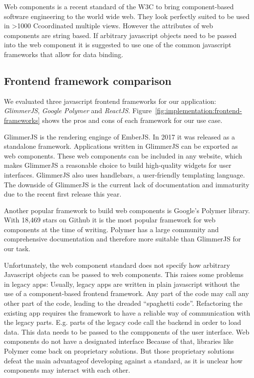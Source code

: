 \documentclass{article}
\newcommand\hmm[1]{\ifnum\ifhmode\spacefactor\else2000\fi>1000 \uppercase{#1}\else#1\fi}
\newcommand{\cmvs}{\hmm{c}oordinated multiple views}
\begin{document}
Web components is a recent standard of the W3C\cite{W3C2017} to bring component-based software engineering to the world wide web.
They look perfectly suited to be used in \cmvs{}.
However the attributes of web components are string based.
If arbitrary javascript objects need to be passed into the web component it is suggested to use one of the common javascript frameworks that allow for data binding.

\subsection{Frontend framework comparison}

We evaluated three javascript frontend frameworks for our application: \emph{GlimmerJS}, \emph{Google Polymer} and \emph{ReactJS}.
Figure~\ref{fig:implementation:frontend-frameworks} shows the pros and cons of each framework for our use case.

GlimmerJS is the rendering enginge of EmberJS\cite{Ember2017}.
In 2017 it was released as a standalone framework.
Applications written in GlimmerJS can be exported as web components.
These web components can be included in any website, which makes GlimmerJS a reasonable choice to build high-quality widgets for user interfaces.
GlimmerJS also uses handlebars\cite{Handlebars2017}, a user-friendly templating language.
The downside of GlimmerJS is the current lack of documentation and immaturity due to the recent first release this year.

Another popular framework to build web components is Google's Polymer library\cite{Polymer2017}.
With 18,469 stars on Github it is the most popular framework for web components at the time of writing.
Polymer has a large community and comprehensive documentation and therefore more suitable than GlimmerJS for our task.

Unfortunately, the web component standard does not specify how arbitrary Javascript objects can be passed to web components.
This raises some problems in legacy apps:
Usually, legacy apps are written in plain javascript without the use of a component-based frontend framework.
Any part of the code may call any other part of the code, leading to the dreaded ``spaghetti code''.
Refactoring the existing app requires the framework to have a reliable way of communication with the legacy parts. 
E.g. parts of the legacy code call the backend in order to load data.
This data needs to be passed to the compponents of the user interface.
Web components do not have a designated interface
Because of that, libraries like Polymer come back on proprietary solutions.
But those proprietary solutions defeat the main advantageof developing against a standard, as it is unclear how components may interact with each other.
\end{document}

